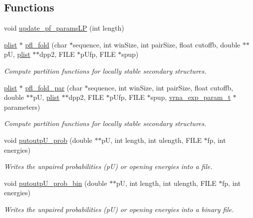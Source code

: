 \subsection*{Functions}
\begin{DoxyCompactItemize}
\item 
void \hyperlink{group__local__pf__fold_ga5a019014d37fe6105131dfc2fc447880}{update\+\_\+pf\+\_\+params\+LP} (int length)
\item 
\hyperlink{group__data__structures_gab1d8894b43aa84cbc50b862a73785fbc}{plist} $\ast$ \hyperlink{group__local__pf__fold_ga7dcf599d07258801ea55e7d14a56908d}{pfl\+\_\+fold} (char $\ast$sequence, int win\+Size, int pair\+Size, float cutoffb, double $\ast$$\ast$pU, \hyperlink{group__data__structures_gab1d8894b43aa84cbc50b862a73785fbc}{plist} $\ast$$\ast$dpp2, F\+I\+LE $\ast$p\+Ufp, F\+I\+LE $\ast$spup)
\begin{DoxyCompactList}\small\item\em Compute partition functions for locally stable secondary structures. \end{DoxyCompactList}\item 
\hyperlink{group__data__structures_gab1d8894b43aa84cbc50b862a73785fbc}{plist} $\ast$ \hyperlink{group__local__pf__fold_ga14c2b82fdd5ab7a1951f1c2db4f5cf2c}{pfl\+\_\+fold\+\_\+par} (char $\ast$sequence, int win\+Size, int pair\+Size, float cutoffb, double $\ast$$\ast$pU, \hyperlink{group__data__structures_gab1d8894b43aa84cbc50b862a73785fbc}{plist} $\ast$$\ast$dpp2, F\+I\+LE $\ast$p\+Ufp, F\+I\+LE $\ast$spup, \hyperlink{group__energy__parameters_ga01d8b92fe734df8d79a6169482c7d8d8}{vrna\+\_\+exp\+\_\+param\+\_\+t} $\ast$parameters)\hypertarget{group__local__pf__fold_ga14c2b82fdd5ab7a1951f1c2db4f5cf2c}{}\label{group__local__pf__fold_ga14c2b82fdd5ab7a1951f1c2db4f5cf2c}

\begin{DoxyCompactList}\small\item\em Compute partition functions for locally stable secondary structures. \end{DoxyCompactList}\item 
void \hyperlink{group__local__pf__fold_ga0bcb751860bbf34e3dfee8c2fbdb3ef3}{putoutp\+U\+\_\+prob} (double $\ast$$\ast$pU, int length, int ulength, F\+I\+LE $\ast$fp, int energies)
\begin{DoxyCompactList}\small\item\em Writes the unpaired probabilities (pU) or opening energies into a file. \end{DoxyCompactList}\item 
void \hyperlink{group__local__pf__fold_ga9acb00ee10e96b1ca4ea394cd8bcec75}{putoutp\+U\+\_\+prob\+\_\+bin} (double $\ast$$\ast$pU, int length, int ulength, F\+I\+LE $\ast$fp, int energies)
\begin{DoxyCompactList}\small\item\em Writes the unpaired probabilities (pU) or opening energies into a binary file. \end{DoxyCompactList}\end{DoxyCompactItemize}


